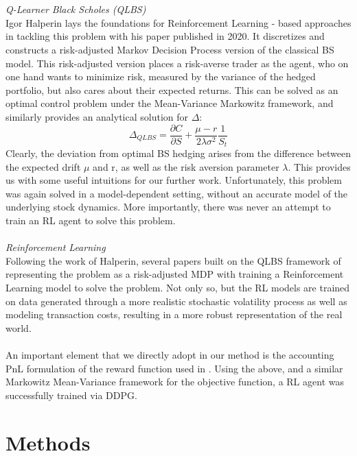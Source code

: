 \documentclass{article}
\begin{document}
\\\\
\textit{Q-Learner Black Scholes (QLBS)}\\Igor Halperin lays the foundations for Reinforcement Learning - based approaches in tackling this problem with his paper published in 2020\cite{halperin}. It discretizes and constructs a risk-adjusted Markov Decision Process version of the classical BS model. This risk-adjusted version places a risk-averse trader as the agent, who on one hand wants to minimize risk, measured by the variance of the hedged portfolio, but also cares about their expected returns. This can be solved as an optimal control problem under the Mean-Variance Markowitz framework, and similarly provides an analytical solution for $\Delta$:
\begin{equation}
    \Delta_{QLBS} = \frac{\partial C}{\partial S} +\frac{\mu - r}{2\lambda \sigma^2}\frac{1}{S_t}
\end{equation}
Clearly, the deviation from optimal BS hedging arises from the difference between the expected drift $\mu$ and r, as well as the risk aversion parameter $\lambda$. This provides us with some useful intuitions for our further work. Unfortunately, this problem was again solved in a model-dependent setting, without an accurate model of the underlying stock dynamics. More importantly, there was never an attempt to train an RL agent to solve this problem.
\\\\
\textit{Reinforcement Learning}\\
Following the work of Halperin, several papers built on the QLBS framework of representing the problem as a risk-adjusted MDP with training a Reinforcement Learning model to solve the problem\cite{cao}\cite{stoiljkovic}\cite{du}. Not only so, but the RL models are trained on data generated through a more realistic stochastic volatility process as well as modeling transaction costs, resulting in a more robust representation of the real world.\\\\
An important element that we directly adopt in our method is the accounting PnL formulation of the reward function used in \cite{cao}. Using the above, and a similar Markowitz Mean-Variance framework for the objective function, a RL agent was successfully trained via DDPG. 
\section{Methods}
\end{document}
